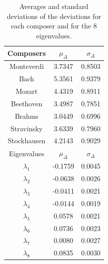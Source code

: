 \documentclass[
 aip,
 jmp,
 amsmath,amssymb,
 reprint,
]{revtex4-1}
\begin{document}
\begin{table}%
\caption{\label{tab:tableDmus}Averages and standard deviations of the 
deviations for each composer and for the 
8 eigenvalues.}
\begin{tabular}{|c||c|c|}
\hline
Composers & $\mu_{\Delta}$ & $\sigma_{\Delta}$ \\
\hline
Monteverdi     & 3.7347 & 0.8503 \\
Bach           & 5.3561 & 0.9379 \\
Mozart         & 4.4319 & 0.8911 \\
Beethoven      & 3.4987 & 0.7851 \\
Brahms         & 3.0449 & 0.6996 \\
Stravinsky     & 3.6339 & 0.7960 \\
Stockhausen    & 4.2143 & 0.9029 \\
\hline \hline
Eigenvalues & $\mu_{\Delta}$ & $\sigma_{\Delta}$ \\
\hline
$\lambda_1$ &  -0.1759 & 0.0045 \\
$\lambda_2$ &  -0.0638 & 0.0026 \\
$\lambda_3$ &  -0.0411 & 0.0021 \\
$\lambda_4$ &  -0.0144 & 0.0019 \\
$\lambda_5$ &   0.0578 & 0.0021 \\
$\lambda_6$ &   0.0736 & 0.0023 \\
$\lambda_7$ &   0.0080 & 0.0027 \\
$\lambda_8$ &   0.0835 & 0.0030 \\
\hline
\end{tabular}
\end{table}
\end{document}
